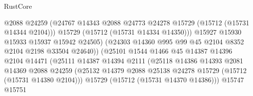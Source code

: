 \begin{lexlean}{RustCore}
\begin{coremodule}
                                      @2088
                                      @24259
                                      (@24767
                                        @14343
                                        @2088
                                        @24773
                                        @24278
                                        @15729
                                        (@15712 (@15731 @14344 @2104)))
                                      @15729
                                      (@15712 (@15731 @14334 @14350)))
                                    @15927
                                    @15930
                                    @15933
                                    @15937
                                    @15942
                                    @24505)
                                  (@24303
                                    @14360
                                    @995
                                    @99
                                    @45
                                    @2104
                                    @8352
                                    @2104
                                    @2198
                                    @33504
                                    @24640))
                                (@25101
                                  @1544
                                  @1466
                                  @45
                                  @14387
                                  @14396
                                  @2104
                                  @14471
                                  (@25111
                                    @14387
                                    @14394
                                    @2111
                                    (@25118
                                      @14386
                                      @14393
                                      @2081
                                      @14369
                                      @2088
                                      @24259
                                      (@25132
                                        @14379
                                        @2088
                                        @25138
                                        @24278
                                        @15729
                                        (@15712 (@15731 @14380 @2104)))
                                      @15729
                                      (@15712 (@15731 @14370 @14386)))
                                    @15747
                                    @15751

\end{coremodule}
\end{lexlean}
